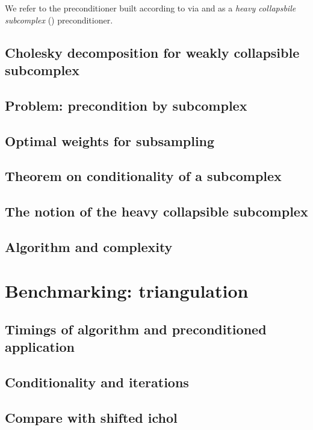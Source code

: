 We refer to the preconditioner built according to  via  and  as a \emph{heavy collapsbile subcomplex} (\algname) preconditioner.




\subsection{ Cholesky decomposition for weakly collapsible subcomplex }

\subsection{ Problem: precondition by subcomplex }


\subsection{ Optimal weights for subsampling }


\subsection{ Theorem on conditionality of a subcomplex }


\subsection{ The notion of the heavy collapsible subcomplex }


\subsection{ Algorithm and complexity }









\section{Benchmarking: triangulation}

\subsection{ Timings of algorithm and preconditioned application }

\subsection{ Conditionality and iterations }


\subsection{ Compare with shifted ichol }








